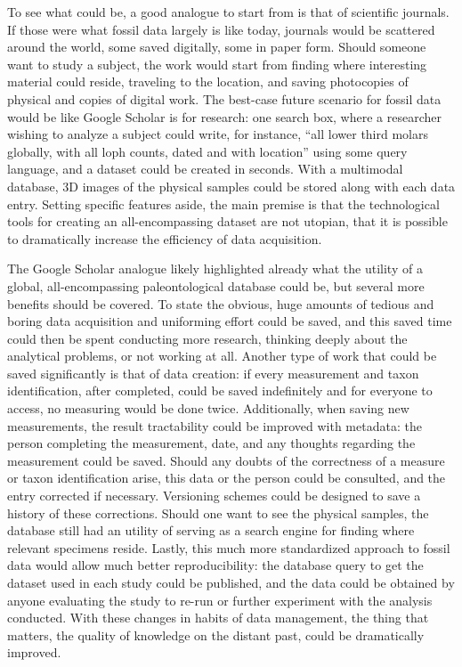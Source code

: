 \documentclass[english,twoside,openright]{UH_DS_MSc}
\begin{document}
To see what could be, a good analogue to start from is that of scientific journals. If those were what fossil data largely is like today, journals would be scattered around the world, some saved digitally, some in paper form. Should someone want to study a subject, the work would start from finding where interesting material could reside, traveling to the location, and saving photocopies of physical and copies of digital work. The best-case future scenario for fossil data would be like Google Scholar is for research: one search box, where a researcher wishing to analyze a subject could write, for instance, ``all lower third molars globally, with all loph counts, dated and with location'' using some query language, and a dataset could be created in seconds. With a multimodal database, 3D images of the physical samples could be stored along with each data entry. Setting specific features aside, the main premise is that the technological tools for creating an all-encompassing dataset are not utopian, that it is possible to dramatically increase the efficiency of data acquisition.

The Google Scholar analogue likely highlighted already what the utility of a global, all-encompassing paleontological database could be, but several more benefits should be covered. To state the obvious, huge amounts of tedious and boring data acquisition and uniforming effort could be saved, and this saved time could then be spent conducting more research, thinking deeply about the analytical problems, or not working at all. Another type of work that could be saved significantly is that of data creation: if every measurement and taxon identification, after completed, could be saved indefinitely and for everyone to access, no measuring would be done twice. Additionally, when saving new measurements, the result tractability could be improved with metadata: the person completing the measurement, date, and any thoughts regarding the measurement could be saved. Should any doubts of the correctness of a measure or taxon identification arise, this data or the person could be consulted, and the entry corrected if necessary. Versioning schemes could be designed to save a history of these corrections. Should one want to see the physical samples, the database still had an utility of serving as a search engine for finding where relevant specimens reside. Lastly, this much more standardized approach to fossil data would allow much better reproducibility: the database query to get the dataset used in each study could be published, and the data could be obtained by anyone evaluating the study to re-run or further experiment with the analysis conducted. With these changes in habits of data management, the thing that matters, the quality of knowledge on the distant past, could be dramatically improved.
\end{document}
